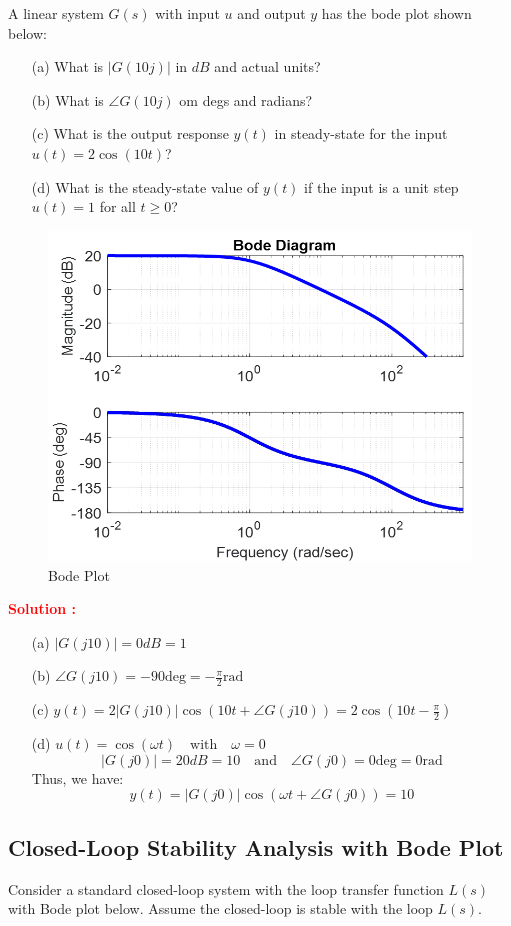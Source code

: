 \documentclass[12pt]{article}
\begin{document}
A linear system \(G(s)\) with input \(u\) and output \(y\) has the bode plot shown below:
\begin{itemize}
    \item[(a)] What is \(|G(10j)|\) in \(dB\) and actual units?
    \item[(b)] What is \(\angle G(10j)\) om degs and radians?
    \item[(c)] What is the output response \(y(t)\) in steady-state for the input \(u(t) = 2 \cos(10t)\)?
    \item[(d)] What is the steady-state value of \(y(t)\) if the input is a unit step \(u(t) = 1\) for all \(t \geq 0\)?
\end{itemize}
\begin{figure}[h]
\centering
\includegraphics[width=0.6\linewidth]{figs/6.3ver2.png}
\caption{Bode Plot}
\end{figure}
\textbf{\textcolor{red}{Solution :}}
\begin{itemize}
    \item[(a)] \(|G(j10)| = 0 dB = 1\)
    \item[(b)] \(\angle G(j10) = -90 \text{deg} = -\frac{\pi}{2} \text{rad}\)
    \item[(c)] \(y(t) = 2|G(j10)|\cos(10t + \angle G(j10)) = 2 \cos(10t-\frac{\pi}{2}) \)
    \item[(d)] \(u(t) = \cos(\omega t) \quad \text{with} \quad \omega = 0\)
    \[|G(j0)| = 20 dB = 10 \quad \text{and} \quad \angle G(j0) = 0 \text{deg} = 0 \text{rad}\]
    Thus, we have:
    \[y(t) = |G(j0)| \cos(\omega t + \angle G(j0)) = 10 \]
\end{itemize}
\clearpage

\subsection{Closed-Loop Stability Analysis with Bode Plot}

Consider a standard closed-loop system with the loop transfer function $L(s)$ with Bode plot below.  Assume the closed-loop is stable with the loop $L(s)$.
\end{document}
